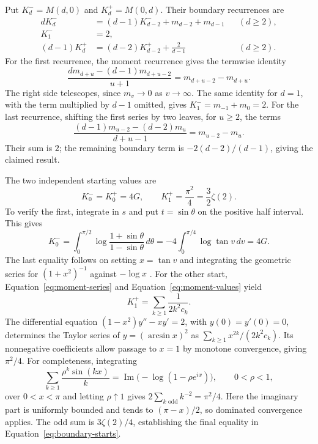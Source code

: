Put $K^-_d=M(d,0)$ and $K^+_d=M(0,d)$. Their boundary recurrences are
\begin{equation}\label{eq:boundary-recurrences}
\begin{aligned}
dK^-_d&=(d-1)K^-_{d-2}+m_{d-2}+m_{d-1} &&(d\ge2),\\
K^-_1&=2,\\
(d-1)K^+_d&=(d-2)K^+_{d-2}+\frac{2}{d-1} &&(d\ge2).
\end{aligned}
\end{equation}
For the first recurrence, the moment recurrence gives the termwise identity
\[
\frac{d m_{d+u}-(d-1)m_{d+u-2}}{u+1}
=m_{d+u-2}-m_{d+u}.
\]
The right side telescopes, since $m_v\to0$ as $v\to\infty$.
The same identity for $d=1$, with the term multiplied by $d-1$ omitted,
gives $K^-_1=m_{-1}+m_0=2$. For the last recurrence, shifting the
first series by two leaves, for $u\ge2$, the terms
\[
\frac{(d-1)m_{u-2}-(d-2)m_u}{d+u-1}=m_{u-2}-m_u.
\]
Their sum is $2$; the remaining boundary term is
$-2(d-2)/(d-1)$, giving the claimed result.

The two independent starting values are
\begin{equation}\label{eq:boundary-starts}
K^-_0=K^+_0=4G,\qquad K^+_1=\frac{\pi^2}{4}=\frac32\zeta(2).
\end{equation}
To verify the first, integrate in $s$ and put $t=\sin\theta$ on the
positive half interval. This gives
\[
K^-_0=\int_0^{\pi/2}\log\frac{1+\sin\theta}{1-\sin\theta}\,d\theta
=-4\int_0^{\pi/4}\log\tan v\,dv=4G.
\]
The last equality follows on setting $x=\tan v$ and integrating the
geometric series for $(1+x^2)^{-1}$ against $-\log x$ \cite{Catalan1865}.
For the other start, Equation~\eqref{eq:moment-series} and
Equation~\eqref{eq:moment-values} yield
\[
K^+_1=\sum_{k\ge1}\frac{1}{2k^2c_k}.
\]
The differential equation
$(1-x^2)y''-xy'=2$, with $y(0)=y'(0)=0$, determines the Taylor
series of $y=(\arcsin x)^2$ as
$\sum_{k\ge1}x^{2k}/(2k^2c_k)$. Its nonnegative coefficients allow
passage to $x=1$ by monotone convergence, giving $\pi^2/4$.
For completeness, integrating
\[
\sum_{k\ge1}\frac{\rho^k\sin(kx)}{k}
=\operatorname{Im}\bigl(-\log(1-\rho e^{ix})\bigr),\qquad0<\rho<1,
\]
over $0<x<\pi$ and letting $\rho\uparrow1$ gives
$2\sum_{k\text{ odd}}k^{-2}=\pi^2/4$.
Here the imaginary part is uniformly bounded and tends to $(\pi-x)/2$,
so dominated convergence applies. The odd sum is $3\zeta(2)/4$,
establishing the final equality in Equation~\eqref{eq:boundary-starts}.

